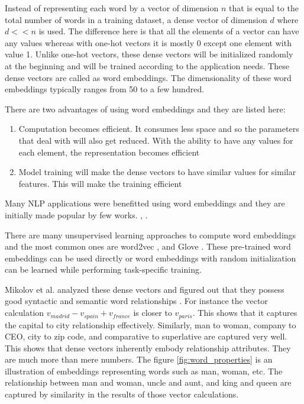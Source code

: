 \documentclass[a4paper, 11pt]{article}
\begin{document}
Instead of representing each word by a vector of dimension $n$ that is equal to the total number of words in a training dataset, a dense vector of dimension $d$ where $d << n$ is used. The difference here is that all the elements of a vector can have any values whereas with one-hot vectors it is mostly 0 except one element with value 1. Unlike one-hot vectors, these dense vectors will be initialized randomly at the beginning and will be trained according to the application needs. These dense vectors are called as word embeddings. The dimensionality of these word embeddings typically ranges from 50 to a few hundred. 

There are two advantages of using word embeddings and they are listed here:
\begin{enumerate}
\item Computation becomes efficient. It consumes less space and so the parameters that deal with will also get reduced. With the ability to have any values for each element, the representation becomes efficient
\item Model training will make the dense vectors to have similar values for similar features. This will make the training efficient
\end{enumerate}

Many NLP applications were benefitted using word embeddings and they are initially made popular by few works. \parencite{10.5555/944919.944966}, \parencite{Schwenk2006}. 

There are many unsupervised learning approaches to compute word embeddings and the most common ones are word2vec \parencite{mikolov2013efficient}, and Glove \parencite{pennington2014glove}. These pre-trained word embeddings can be used directly or word embeddings with random initialization can be learned while performing task-specific training. 

Mikolov et al. analyzed these dense vectors and figured out that they possess good syntactic and semantic word relationships \parencite{mikolov2013linguistic}. For instance the vector calculation $v_{madrid} - v_{spain} + v_{france}$ is closer to $v_{paris}$.  This shows that it captures the capital to city relationship effectively. Similarly, man to woman, company to CEO, city to zip code, and comparative to superlative are captured very well. This shows that dense vectors inherently embody relationship attributes. They are much more than mere numbers. The figure \ref{fig:word_properties} is an illustration of embeddings representing words such as man, woman, etc. The relationship between man and woman, uncle and aunt, and king and queen are captured by similarity in the results of those vector calculations.
\end{document}
